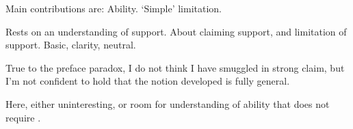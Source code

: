 \begin{note}
  Main contributions are:
  Ability.
  `Simple' limitation.
\end{note}

\begin{note}
  Rests on an understanding of support.
  About claiming support, and limitation of support.
  Basic, clarity, neutral.

  True to the preface paradox, I do not think I have smuggled in strong claim, but I'm not confident to hold that the notion developed is fully general.

  Here, either uninteresting, or room for understanding of ability that does not require \WR{}.
\end{note}

